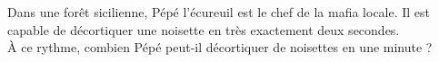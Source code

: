 Dans une forêt sicilienne, Pépé l'écureuil est le chef de la mafia
locale. Il est capable de décortiquer une noisette en très exactement
deux secondes.\\\`A ce rythme, combien Pépé peut-il décortiquer de
noisettes en une minute ?